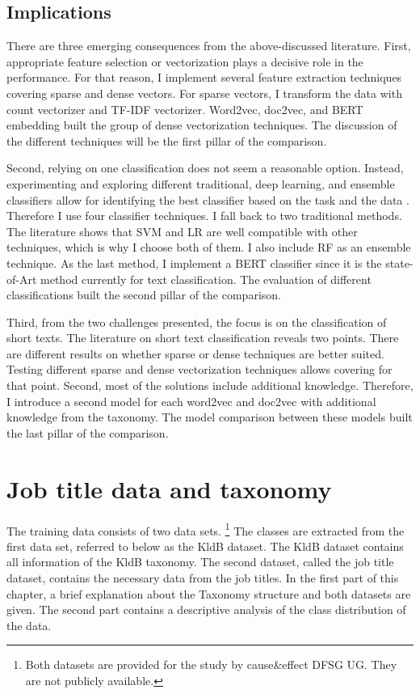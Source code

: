 \documentclass[12pt, a4paper, titlepage]{article}
\begin{document}
\subsection*{Implications}
There are three emerging consequences from the above-discussed literature. First, appropriate feature selection or vectorization plays a decisive role in the performance. For that reason, I implement several feature extraction techniques covering sparse and dense vectors. For sparse vectors, I transform the data with count vectorizer and \ac{TF-IDF} vectorizer. Word2vec, doc2vec, and \ac{BERT} embedding built the group of dense vectorization techniques. The discussion of the different techniques will be the first pillar of the comparison. 

Second, relying on one classification does not seem a reasonable option. Instead, experimenting and exploring different traditional, deep learning, and ensemble classifiers allow for identifying the best classifier based on the task and the data \citep{maglogiannis2007}. Therefore I use four classifier techniques. I fall back to two traditional methods. The literature shows that \ac{SVM} and \ac{LR} are well compatible with other techniques, which is why I choose both of them. I also include \ac{RF} as an ensemble technique. As the last method, I implement a \ac{BERT} classifier since it is the state-of-Art method currently for text classification. The evaluation of different classifications built the second pillar of the comparison. 

Third, from the two challenges presented, the focus is on the classification of short texts. The literature on short text classification reveals two points. There are different results on whether sparse or dense techniques are better suited. Testing different sparse and dense vectorization techniques allows covering for that point. Second, most of the solutions include additional knowledge. Therefore, I introduce a second model for each word2vec and doc2vec with additional knowledge from the taxonomy. The model comparison between these models built the last pillar of the comparison. 


\section{Job title data and taxonomy}
The training data consists of two data sets. \footnote{Both datasets are provided for the study by cause\&effect DFSG UG. They are not publicly available.} The classes are extracted from the first data set, referred to below as the \ac{KldB} dataset. The \ac{KldB} dataset contains all information of the \ac{KldB} taxonomy. The second dataset, called the job title dataset, contains the necessary data from the job titles. In the first part of this chapter, a brief explanation about the Taxonomy structure and both datasets are given. The second part contains a descriptive analysis of the class distribution of the data. 
\end{document}
